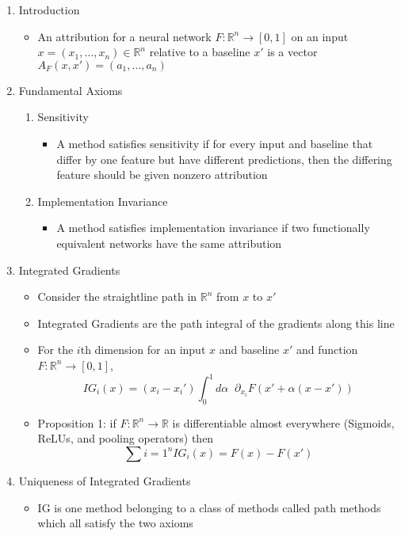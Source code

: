 \documentclass{article}
\begin{document}
\begin{enumerate}
	\item Introduction
	\begin{itemize}
		\item An attribution for a neural network $F: \mathbb{R}^n  \rightarrow [0, 1]$ on an input $x = (x_1, \dots, x_n) \in \mathbb{R}^n$ relative to a baseline $x'$ is a vector $A_F(x, x') = (a_1, \dots, a_n)$
	\end{itemize} 
	\item Fundamental Axioms
	\begin{enumerate}
		\item Sensitivity
		\begin{itemize}
			\item A method satisfies sensitivity if for every input and baseline that differ by one feature but have different predictions, then the differing feature should be given nonzero attribution
		\end{itemize}
		\item Implementation Invariance
		\begin{itemize}
			\item A method satisfies implementation invariance if two functionally equivalent networks have the same attribution
		\end{itemize}
	\end{enumerate}
	\item Integrated Gradients
	\begin{itemize}
		\item Consider the straightline path in $\mathbb{R}^n$ from $x$ to $x'$
		\item Integrated Gradients are the path integral of the gradients along this line
		\item For the $i$th dimension for an input $x$ and baseline $x'$ and function $F: \mathbb{R}^n \rightarrow [0, 1]$,
		$$IG_i(x) = (x_i - x_i') \int_{0}^1 d\alpha \;\; \partial_{x_i} F(x' + \alpha(x-x')) $$
		\item Proposition 1: if $F: \mathbb{R}^n \rightarrow \mathbb{R}$ is differentiable almost everywhere (Sigmoids, ReLUs, and pooling operators) then 
		$$\sum{i=1}^n IG_i(x) = F(x) - F(x')$$
	\end{itemize}
	\item Uniqueness of Integrated Gradients
	\begin{itemize}
		\item IG is one method belonging to a class of methods called path methods which all satisfy the two axioms

\end{itemize}
\end{enumerate}
\end{document}
